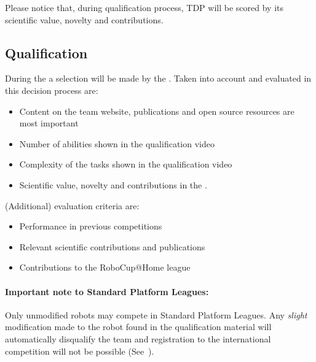 Please notice that, during qualification process, TDP will be scored by its scientific value, novelty and contributions.


\subsection{Qualification}
\label{rule:qualification}

During the  a selection will be made by the . Taken into account and evaluated in this decision process are:
\begin{itemize}
	\item Content on the team website, publications and open source resources are most important
	\item Number of abilities shown in the qualification video
	\item Complexity of the tasks shown in the qualification video
	\item Scientific value, novelty and contributions in the . %
\end{itemize}
(Additional) evaluation criteria are:
\begin{itemize}
	\item Performance in previous competitions
	\item Relevant scientific contributions and publications
	\item Contributions to the RoboCup@Home league
\end{itemize}

\paragraph{Important note to Standard Platform Leagues:} Only unmodified robots may compete in Standard Platform Leagues. Any \textit{slight} modification made to the robot found in the qualification material will automatically disqualify the team and registration to the international competition will not be possible  (See~).



